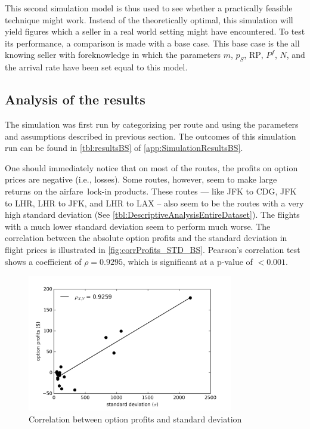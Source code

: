 This second simulation model is thus used to see whether a practically feasible technique might work. Instead of the theoretically optimal, this simulation will yield figures which a seller in a real world setting might have encountered. To test its performance, a comparison is made with a base case. This base case is the all knowing seller with foreknowledge in which the parameters $m$, $p_S$, $\mbox{RP}$, $P^f$, $N$, and the arrival rate have been set equal to this model.


\subsection{Analysis of the results}
\label{subsec:AnalysisOfBS}
The simulation was first run by categorizing per route and using the parameters and assumptions described in previous section. The outcomes of this simulation run can be found in \autoref{tbl:resultsBS} of \autoref{app:SimulationResultsBS}.

One should immediately notice that on most of the routes, the profits on option prices are negative (i.e., losses). Some routes, however, seem to make large returns on the airfare~lock-in products. These routes --- like JFK to CDG, JFK to LHR, LHR to JFK, and LHR to LAX -- also seem to be the routes with a very high standard deviation (See \autoref{tbl:DescriptiveAnalysisEntireDataset}). The flights with a much lower standard deviation seem to perform much worse. The correlation between the absolute option profits and the standard deviation in flight prices is illustrated in \autoref{fig:corrProfits_STD_BS}. Pearson's correlation test shows a coefficient of $\rho = 0.9295$, which is significant at a p-value of $< 0.001$.




\begin{figure}
    \centering
    \includegraphics[width=0.8\textwidth]{figures/correlation_optionProfits_STD_BS}
    \caption{Correlation between option profits and standard deviation}
    \label{fig:corrProfits_STD_BS}
\end{figure}

